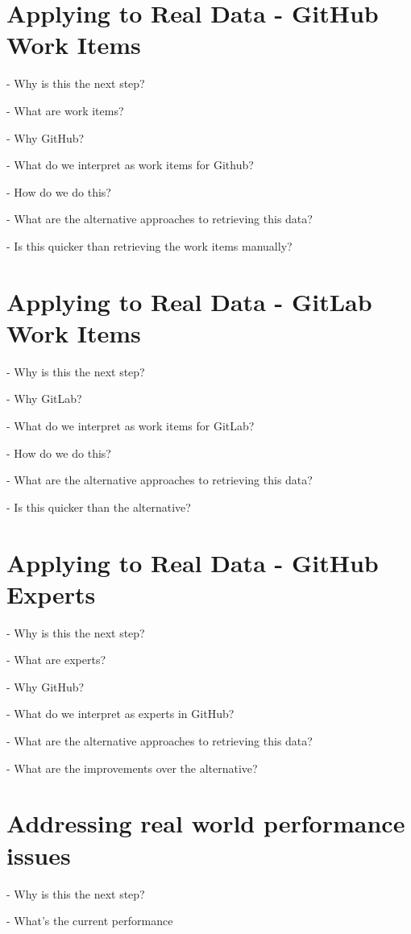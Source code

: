 	
\section{Applying to Real Data - GitHub Work Items}

- Why is this the next step?

- What are work items?

- Why GitHub?

- What do we interpret as work items for Github?

- How do we do this?

- What are the alternative approaches to retrieving this data?

- Is this quicker than retrieving the work items manually?

\section{Applying to Real Data - GitLab Work Items}

- Why is this the next step?

- Why GitLab?

- What do we interpret as work items for GitLab?

- How do we do this?

- What are the alternative approaches to retrieving this data?

- Is this quicker than the alternative?

\section{Applying to Real Data - GitHub Experts}

- Why is this the next step?

- What are experts?

- Why GitHub?

- What do we interpret as experts in GitHub?

- What are the alternative approaches to retrieving this data?

- What are the improvements over the alternative?

\section{Addressing real world performance issues}

- Why is this the next step?

- What's the current performance

